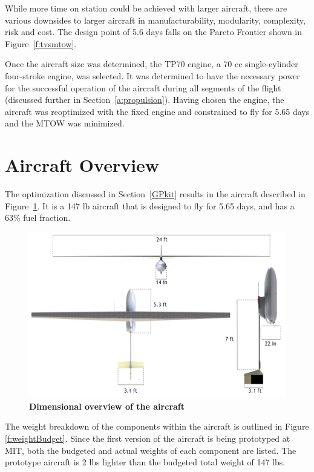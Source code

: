 \documentclass[journal]{aiaa-tc}%
\begin{document}
While more time on station could be achieved with larger aircraft, there are various downsides to larger aircraft in manufacturability, modularity, complexity, risk and cost. The design point of 5.6 days falls on the Pareto Frontier shown in Figure~\ref{f:tvsmtow}. 

Once the aircraft size was determined, the TP70 engine, a 70 cc single-cylinder four-stroke engine, was selected. It was determined to have the necessary power for the successful operation of the aircraft during all segments of the flight (discussed further in Section~\ref{a:propulsion}). Having chosen the engine, the aircraft was reoptimized with the fixed engine and constrained to fly for 5.65 days and the MTOW was minimized.  

\section{Aircraft Overview}
\label{Aircraft Overview}

The optimization discussed in Section~\ref{GPkit} results in the aircraft described in Figure~\ref{f:dimensions}. It is a 147 lb aircraft that is designed to fly for 5.65 days, and has a 63\% fuel fraction. 

\begin{figure}[H]
    \begin{center}
    \includegraphics[width = .75\textwidth]{dimensions}
     \caption{ \textbf{Dimensional overview of the aircraft} }
    \label{f:dimensions}
    \end{center}
\end{figure}

The weight breakdown of the components within the aircraft is outlined in Figure \ref{f:weightBudget}. Since the first version of the aircraft is being prototyped at MIT, both the budgeted and actual weights of each component are listed. The prototype aircraft is 2 lbs lighter than the budgeted total weight of 147 lbs. 
\end{document}
